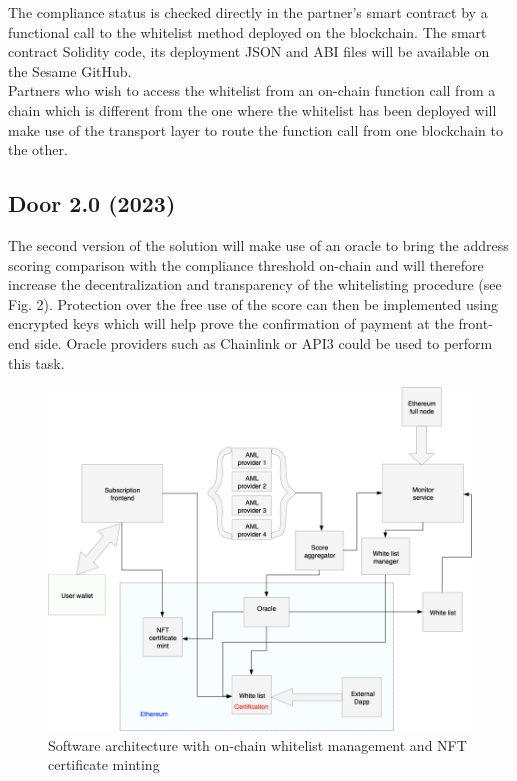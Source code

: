 ﻿\documentclass[a4paper]{article}
\begin{document}
The compliance status is checked directly in the partner's smart contract by a functional call to the whitelist method deployed on the blockchain. The smart contract Solidity code, its deployment JSON and ABI files will be available on the Sesame GitHub. \\

Partners who wish to access the whitelist from an on-chain function call from a chain which is different from the one where the whitelist has been deployed will make use of the transport layer to route the function call from one blockchain to the other.
\subsection{Door 2.0 (2023)}
The second version of the solution will make use of an oracle to bring the address scoring comparison with the compliance threshold on-chain and will therefore increase the decentralization and transparency of the whitelisting procedure (see Fig. 2). Protection over the free use of the score can then be implemented using encrypted keys which will help prove the confirmation of payment at the front-end side. Oracle providers such as Chainlink or API3 could be used to perform this task. \\  

\begin{figure}[!h]
\centering
\includegraphics[scale=0.35]{architecture_v2_trim.png}
\caption{Software architecture with on-chain whitelist management and NFT certificate minting}
\label{onchain}
\end{figure}
\end{document}
